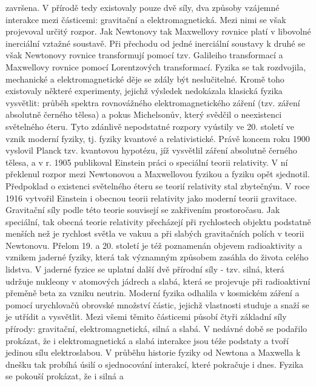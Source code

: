 {    za\-vršena. V přírodě tedy existovaly pouze dvě síly, dva způsoby vzájemné interakce mezi 
    částicemi: gravitační a elektromagnetická. Mezi nimi se však projevoval určitý rozpor. Jak 
    Newtonovy tak Maxwellovy rovnice platí v libovolné inerciální vztažné soustavě. Při přechodu od 
    jedné inerciální soustavy k druhé se však Newtonovy rovnice transformují pomocí tzv. Galileiho 
    transformací a Maxwellovy rovnice pomocí Lorentzových transformací. Fyzika se tak rozdvojila, 
    mechanické a elektromagnetické děje se zdály být neslučitelné. Kromě toho existovaly některé 
    experimenty, jejichž výsledek nedokázala klasická fyzika vysvětlit: průběh spektra rovnovážného 
    elektromagnetického záření (tzv. záření absolutně černého tělesa) a pokus Michelsonův, který 
    svědčil o neexistenci světelného éteru. Tyto zdánlivě nepodstatné rozpory vyústily ve 20. 
    století ve vznik moderní fyziky, tj. fyziky kvantové a relativistické. Právě koncem roku 1900 
    vyslovil Planck tzv. kvantovou hypotézu, jíž vysvětlil záření absolutně černého tělesa, a v r. 
    1905 publikoval Einstein práci o speciální teorii relativity. V ní překlenul rozpor mezi 
    Newtonovou a Maxwellovou fyzikou a fyziku opět sjednotil. Předpoklad o existenci světelného 
    éteru se teorií relativity stal zbytečným. V roce 1916 vytvořil Einstein i obecnou teorii
    relativity jako moderní teorii gravitace. Gravitační síly podle této teorie souvisejí se 
    zakřivením prostoročasu. Jak speciální, tak obecná teorie relativity přecházejí při rychlostech 
    objektu podstatně menších než je rychlost světla ve vakuu a při slabých gravitačních polích v 
    teorii Newtonovu. Přelom 19. a 20. století je též poznamenán objevem radioaktivity a vznikem 
    jaderné fyziky, která tak významným způsobem zasáhla do života celého lidstva. V jaderné fyzice 
    se uplatní další dvě přírodní síly - tzv. silná, která udržuje nukleony v atomových jádrech a 
    slabá, která se projevuje při radioaktivní přeměně beta za vzniku neutrin. Moderní fyzika 
    odhalila v kosmickém záření a pomocí urychlovačů obrovské množství částic, jejichž vlastnosti 
    studuje a snaží se je utřídit a vysvětlit. Mezi všemi těmito částicemi působí čtyři základní 
    síly přírody: gravitační, elektromagnetická, silná a slabá. V nedávné době se podařilo 
    prokázat, že i elektromagnetická a slabá interakce jsou téže podstaty a tvoří jedinou sílu 
    elektroslabou. V průběhu historie fyziky od Newtona a Maxwella k dnešku tak probíhá úsilí o 
    sjednocování interakcí, které pokračuje i dnes. Fyzika se pokouší prokázat, že i silná a 
}
